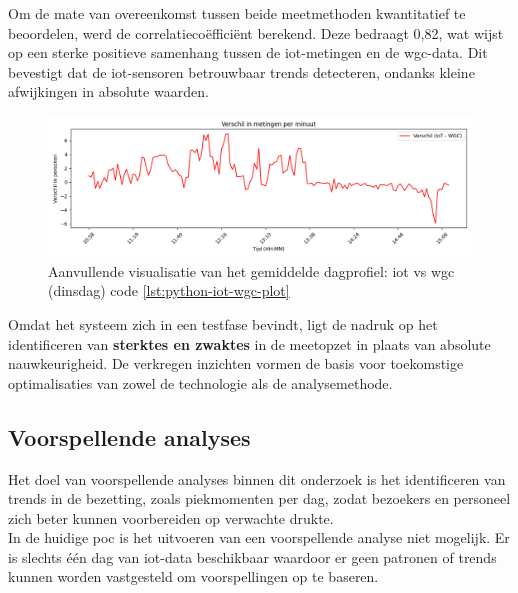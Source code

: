 Om de mate van overeenkomst tussen beide meetmethoden kwantitatief te beoordelen, werd de correlatiecoëfficiënt berekend. Deze bedraagt 0,82, wat wijst op een sterke positieve samenhang tussen de \gls{iot}-metingen en de \gls{wgc}-data.
Dit bevestigt dat de \gls{iot}-sensoren betrouwbaar trends detecteren, ondanks kleine afwijkingen in absolute waarden.


\begin{figure}[htbp]
    \centering
    \includegraphics[width=\textwidth]{img/bp/Figure_2.png}
    \caption{{Aanvullende visualisatie van het gemiddelde dagprofiel: \gls{iot} vs \gls{wgc} (dinsdag) code \ref{lst:python-iot-wgc-plot}}}
    \label{fig:verschil_metingen}
\end{figure}

Omdat het systeem zich in een testfase bevindt, ligt de nadruk op het identificeren van \textbf{sterktes en zwaktes} in de meetopzet in plaats van absolute nauwkeurigheid. De verkregen inzichten vormen de basis voor toekomstige optimalisaties van zowel de technologie als de analysemethode. \\

\subsection{Voorspellende analyses}
Het doel van voorspellende analyses binnen dit onderzoek is het identificeren van trends in de bezetting, zoals piekmomenten per dag, zodat bezoekers en personeel zich beter kunnen voorbereiden op verwachte drukte. \\

In de huidige \gls{poc} is het uitvoeren van een voorspellende analyse niet mogelijk. Er is slechts één dag van \gls{iot}-data beschikbaar waardoor er geen patronen of trends kunnen worden vastgesteld om voorspellingen op te baseren.



